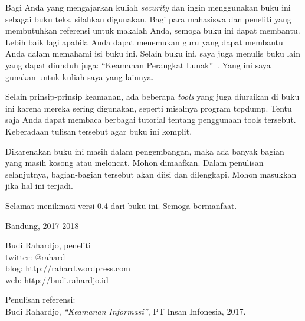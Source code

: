 Bagi Anda yang mengajarkan kuliah {\em security} dan ingin menggunakan
buku ini sebagai buku teks, silahkan digunakan.
Bagi para mahasiswa dan peneliti yang membutuhkan referensi untuk
makalah Anda, semoga buku ini dapat membantu.
Lebih baik lagi apabila Anda dapat menemukan guru yang dapat membantu Anda
dalam memahami isi buku ini.
Selain buku ini, saya juga menulis buku lain yang dapat diunduh juga:
``Keamanan Perangkat Lunak''~\cite{BRsecuresoftware}.
Yang ini saya gunakan untuk kuliah saya yang lainnya.

Selain prinsip-prinsip keamanan, ada beberapa {\em tools} yang juga diuraikan
di buku ini karena mereka sering digunakan, seperti misalnya program tcpdump.
Tentu saja Anda dapat membaca berbagai tutorial tentang penggunaan tools
tersebut. Keberadaan tulisan tersebut agar buku ini komplit.

Dikarenakan buku ini masih dalam pengembangan, maka ada banyak bagian yang
masih kosong atau meloncat. Mohon dimaafkan. Dalam penulisan selanjutnya,
bagian-bagian tersebut akan diisi dan dilengkapi. Mohon masukkan jika hal ini
terjadi.

Selamat menikmati versi 0.4 dari buku ini. Semoga bermanfaat.
\vspace{5 mm}

Bandung, 2017-2018


Budi Rahardjo, peneliti\\
twitter: @rahard\\
blog: http://rahard.wordpress.com\\
web: http://budi.rahardjo.id

\vspace{5 mm}
Penulisan referensi:\\
Budi Rahardjo, {\em ``Keamanan Informasi''}, PT Insan Infonesia, 2017.

\doclicenseThis
